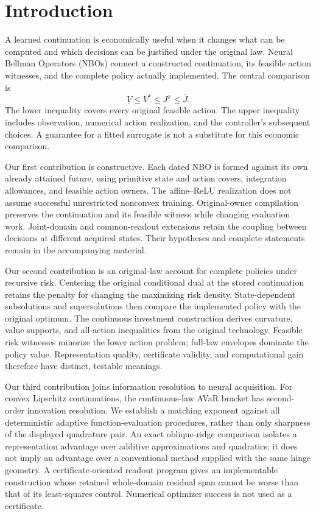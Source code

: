 \section{Introduction}\label{sec:introduction65}
A learned continuation is economically useful when it changes what can be computed and which decisions can be justified under the original law. Neural Bellman Operators (NBOs) connect a constructed continuation, its feasible action witnesses, and the complete policy actually implemented. The central comparison is
\[
 \underline V\leq V^*\leq J^{\widehat\pi}\leq\overline J.
\]
The lower inequality covers every original feasible action. The upper inequality includes observation, numerical action realization, and the controller's subsequent choices. A guarantee for a fitted surrogate is not a substitute for this economic comparison.

Our first contribution is constructive. Each dated NBO is formed against its own already attained future, using primitive state and action covers, integration allowances, and feasible action owners. The affine--ReLU realization does not assume successful unrestricted nonconvex training. Original-owner compilation preserves the continuation and its feasible witness while changing evaluation work. Joint-domain and common-readout extensions retain the coupling between decisions at different acquired states. Their hypotheses and complete statements remain in the accompanying material.

Our second contribution is an original-law account for complete policies under recursive risk. Centering the original conditional dual at the stored continuation retains the penalty for changing the maximizing risk density. State-dependent subsolutions and supersolutions then compare the implemented policy with the original optimum. The continuous investment construction derives curvature, value supports, and all-action inequalities from the original technology. Feasible risk witnesses minorize the lower action problem; full-law envelopes dominate the policy value. Representation quality, certificate validity, and computational gain therefore have distinct, testable meanings.

Our third contribution joins information resolution to neural acquisition. For convex Lipschitz continuations, the continuous-law AVaR bracket has second-order innovation resolution. We establish a matching exponent against all deterministic adaptive function-evaluation procedures, rather than only sharpness of the displayed quadrature pair. An exact oblique-ridge comparison isolates a representation advantage over additive approximations and quadratics; it does not imply an advantage over a conventional method supplied with the same hinge geometry. A certificate-oriented readout program gives an implementable construction whose retained whole-domain residual span cannot be worse than that of its least-squares control. Numerical optimizer success is not used as a certificate.

